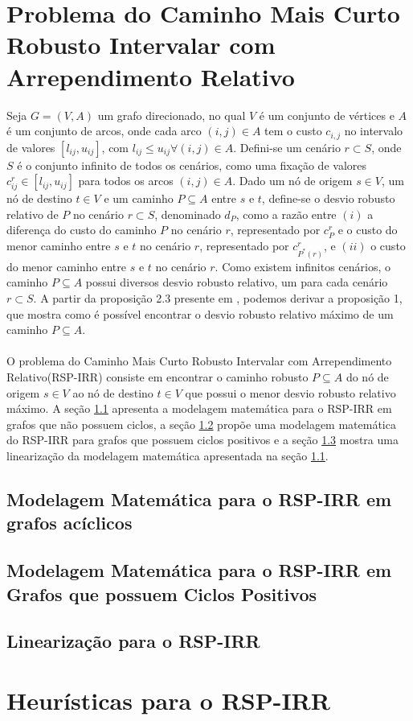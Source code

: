 ﻿\section{Problema do Caminho Mais Curto Robusto Intervalar com Arrependimento Relativo}\label{sec:RSP-IRR}
Seja $G = (V,A)$ um grafo direcionado, no qual $V$ é um conjunto de vértices e $A$ é um conjunto de arcos, 
onde cada arco $(i,j) \in A$ tem o custo $c_{i,j}$ no intervalo de valores $[l_{ij},u_{ij}]$, 
com $l_{ij} \leq u_{ij}  \forall (i,j) \in A$. Defini-se um cenário $r \subset S$, onde $S$ é o conjunto infinito de todos os cenários, como 
uma fixação de valores $c_{ij}^r \in [l_{ij}, u_{ij}]$ para todos os arcos $(i,j)\in A$. Dado um nó de origem $s \in V$, um nó de destino
$t \in V$ e um caminho $P \subseteq A$ entre $s$ e $t$, define-se o desvio robusto relativo de $P$ no cenário $r \subset S$, denominado $d_P$, como 
a razão entre $(i)$ a diferença do custo do caminho $P$ no cenário $r$, representado por $c^r_P$ e o custo do menor caminho entre $s$ e $t$ no cenário $r$, representado
por $c^r_{P^*(r)}$, e $(ii)$ o custo do menor caminho entre $s$ e $t$ no cenário $r$. Como existem infinitos cenários, o caminho $P \subseteq A$ possui 
diversos desvio robusto relativo, um para cada cenário $r \subset S$. A partir da proposição 2.3 presente em \cite{karasan01}, podemos derivar a 
proposição 1, que mostra como é possível encontrar o desvio robusto relativo máximo de um caminho $P \subseteq A$.\\ 

\\
O problema do Caminho Mais Curto Robusto Intervalar com Arrependimento Relativo(RSP-IRR) consiste em encontrar o caminho robusto $P \subseteq A$ do nó de origem
$s \in V$ ao nó de destino $t \in V$ que possui o menor desvio robusto relativo máximo. A seção \ref{sec:modelagem} apresenta a 
modelagem matemática para o RSP-IRR em grafos que não possuem ciclos, a seção \ref{sec:grafosCiclos} propõe uma modelagem 
matemática do RSP-IRR para grafos que possuem ciclos positivos e a seção \ref{sec:linearizacao} mostra uma linearização da modelagem matemática
apresentada na seção \ref{sec:modelagem}. 

\subsection{Modelagem Matemática para o RSP-IRR em grafos acíclicos}\label{sec:modelagem}


\subsection{Modelagem Matemática para o RSP-IRR em Grafos que possuem Ciclos Positivos}\label{sec:grafosCiclos}


\subsection{Linearização para o RSP-IRR}\label{sec:linearizacao}


\section{Heurísticas para o RSP-IRR}\label{sec:heuristicas}

